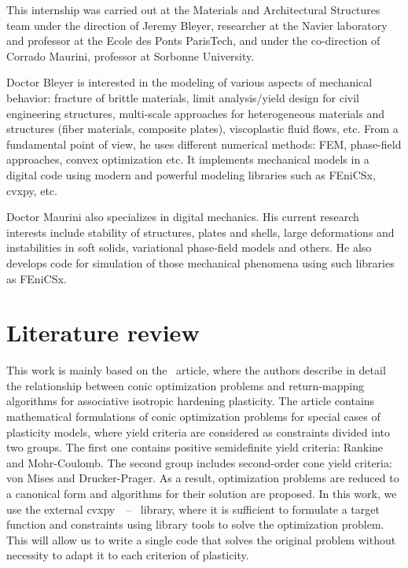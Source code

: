 \documentclass[12pt]{article}
\begin{document}
This internship was carried out at the Materials and Architectural Structures team under the direction of Jeremy Bleyer, researcher at the Navier laboratory and professor at the Ecole des Ponts ParisTech, and under the co-direction of Corrado Maurini, professor at Sorbonne University.
 
Doctor Bleyer is interested in the modeling of various aspects of mechanical behavior: fracture of brittle materials, limit analysis/yield design for civil engineering structures, multi-scale approaches for heterogeneous materials and structures (fiber materials, composite plates), viscoplastic fluid flows, etc. From a fundamental point of view, he uses different numerical methods: FEM, phase-field approaches, convex optimization etc. It implements mechanical models in a digital code using modern and powerful modeling libraries such as FEniCSx, cvxpy, etc. 
 
Doctor Maurini also specializes in digital mechanics. His current research interests include stability of structures, plates and shells, large deformations and instabilities in soft solids, variational phase-field models and others. He also develops code for simulation of those mechanical phenomena using such libraries as FEniCSx.

\newpage
\section{Literature review}

This work is mainly based on the~\parencite{BRUNO2020724} article, where the authors describe in detail the relationship between conic optimization problems and return-mapping algorithms for associative isotropic hardening plasticity. The article contains mathematical formulations of conic optimization problems for special cases of plasticity models, where yield criteria are considered as constraints divided into two groups. The first one contains positive semidefinite yield criteria: Rankine and Mohr-Coulomb. The second group includes second-order cone yield criteria: von Mises and Drucker-Prager. As a result, optimization problems are reduced to a canonical form and algorithms for their solution are proposed. In this work, we use the external cvxpy~\parencite{diamond2016cvxpy}~--~\parencite{agrawal2018rewriting} library, where it is sufficient to formulate a target function and constraints using library tools to solve the optimization problem. This will allow us to write a single code that solves the original problem without necessity to adapt it to each criterion of plasticity.
\end{document}
